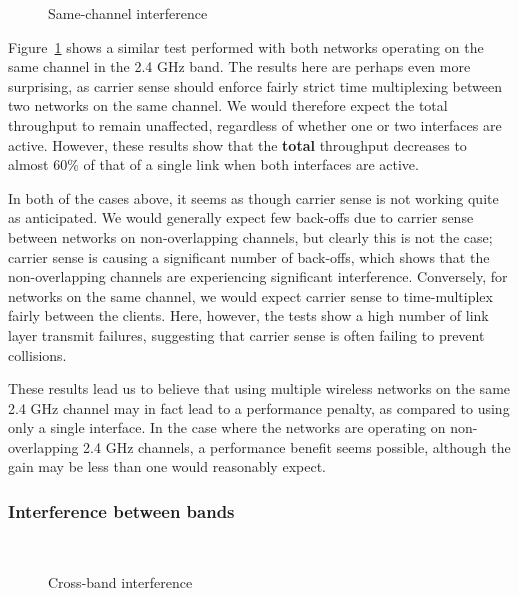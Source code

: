 \begin{figure}[h]
 \centering
 
 \caption{Same-channel interference}\label{graph:sc-interference}
\end{figure}

Figure~\ref{graph:sc-interference} shows a similar test performed with both
networks operating on the same channel in the 2.4 GHz band. The results here are
perhaps even more surprising, as carrier sense should enforce fairly strict
time multiplexing between two networks on the same channel. We would therefore
expect the total throughput to remain unaffected, regardless of
whether one or two interfaces are active. However, these results show that the
\textbf{total} throughput decreases to almost 60\% of that of a single link when
both interfaces are active.

In both of the cases above, it seems as though carrier sense is not working quite
as anticipated. We would generally expect few back-offs due to carrier sense between
networks on non-overlapping channels, but clearly this is not the case; carrier sense is causing a significant number of back-offs, which shows that the non-overlapping channels are experiencing significant interference.
Conversely, for networks on the same channel, we would expect carrier sense to
time-multiplex fairly between the clients. Here, however, the tests show a high number of 
link layer transmit failures, suggesting that carrier sense is often failing 
to prevent collisions.

These results lead us to believe that using multiple wireless networks on the same 2.4 GHz channel may in fact lead to a performance penalty, as compared to using only a
single interface. In the case where the networks are operating on non-overlapping 2.4
GHz channels, a performance benefit seems possible, although the gain may be less
than one would reasonably expect.


\subsubsection{Interference between bands}

\begin{figure}[h]
 \centering
 \subfloat[][uplink] {\
   \label{graph:cb-interference-up}
 }
 \\
 \subfloat[][downlink] {\
   \label{graph:cb-interference-down}
 }
 \caption{Cross-band interference}
\end{figure}

